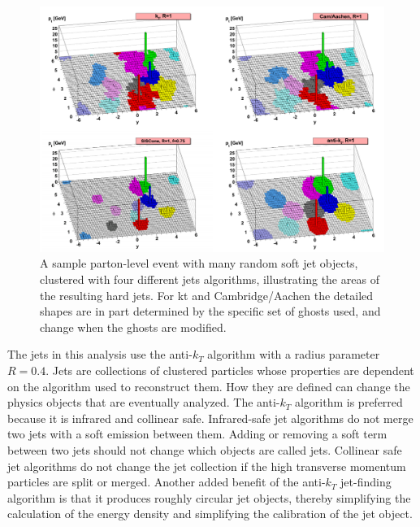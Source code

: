 \begin{figure}[h!]
	\centering
	\includegraphics[width=\columnwidth]{../ThesisImages/Simulation/VarJetAlgs.png}
	\caption[A sample parton-level event with many random soft jet objects, clustered with four different jets algorithms, illustrating the areas of the resulting hard jets. For kt and Cambridge/Aachen the detailed shapes are in part determined by the specific set of ghosts used, and change when the ghosts are modified.]{A sample parton-level event with many random soft jet objects, clustered with four different jets algorithms, illustrating the areas of the resulting hard jets. For kt and Cambridge/Aachen the detailed shapes are in part determined by the specific set of ghosts used, and change when the ghosts are modified\cite{antikt}. 
	}
	\label{fig:VarJetAlgs}
\end{figure}

The jets in this analysis use the anti-$k_T$ algorithm\cite{antikt} with a radius parameter $R=0.4$.  Jets are collections of clustered particles whose properties are dependent on the algorithm used to reconstruct them.  How they are defined can change the physics objects that are eventually analyzed.  The anti-$k_T$ algorithm is preferred because it is infrared and collinear safe.  Infrared-safe jet algorithms do not merge two jets with a soft emission between them.  Adding or removing a soft term between two jets should not change which objects are called jets.  Collinear safe jet algorithms do not change the jet collection if the high transverse momentum particles are split or merged.  Another added benefit of the anti-$k_T$ jet-finding algorithm is that it produces roughly circular jet objects, thereby simplifying the calculation of the energy density and simplifying the calibration of the jet object.

